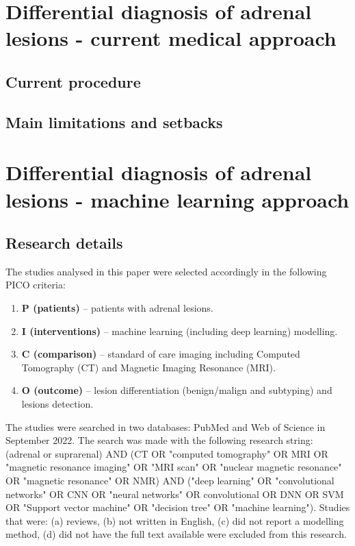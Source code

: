 \documentclass{article}
\begin{document}
\section{Differential diagnosis of adrenal lesions - current medical approach}

\subsection{Current procedure}

\subsection{Main limitations and setbacks}

\section{Differential diagnosis of adrenal lesions - machine learning approach}

\subsection{Research details}

The studies analysed in this paper were selected accordingly in the following PICO criteria:

\begin{enumerate}
    \item[] \textbf{P (patients) }– patients with adrenal lesions.
    \item[] \textbf{I (interventions) }– machine learning (including deep learning) modelling.
    \item[] \textbf{C (comparison) }– standard of care imaging including Computed Tomography (CT) and Magnetic Imaging Resonance (MRI).
    \item[] \textbf{O (outcome) }– lesion differentiation (benign/malign and subtyping) and lesions detection.
\end{enumerate}

The studies were searched in two databases: PubMed and Web of Science in September 2022. The search was made with the following research string: (adrenal or suprarenal) AND
(CT OR "computed tomography" OR MRI OR "magnetic resonance imaging" OR "MRI scan" OR "nuclear magnetic resonance" OR "magnetic resonance" OR NMR)
AND ("deep learning" OR "convolutional networks" OR CNN OR "neural networks" OR convolutional OR DNN OR SVM OR "Support vector machine" OR "decision tree" OR "machine learning").
Studies that were: (a) reviews, (b) not written in English, (c) did not report a modelling method, (d) did not have the full text available were excluded from this research.
\end{document}
